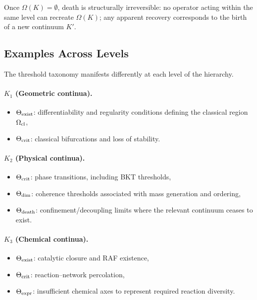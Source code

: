 Once \(\Omega(K)=\emptyset\), death is structurally irreversible:
no operator acting within the same level can recreate \(\Omega(K)\);
any apparent recovery corresponds to the birth of a new continuum \(K'\).

\subsection{Examples Across Levels}

The threshold taxonomy manifests differently at each level of the hierarchy.

\paragraph{\texorpdfstring{\(K_1\)}{K_1} (Geometric continua).}
\begin{itemize}
    \item \(\Theta_{\rm exist}\): differentiability and regularity conditions
          defining the classical region \(\Omega_{\rm cl}\),
    \item \(\Theta_{\rm crit}\): classical bifurcations and loss of stability.
\end{itemize}

\paragraph{\texorpdfstring{\(K_2\)}{K_2} (Physical continua).}
\begin{itemize}
    \item \(\Theta_{\rm crit}\): phase transitions, including BKT thresholds,
    \item \(\Theta_{\rm dim}\): coherence thresholds associated with
          mass generation and ordering,
    \item \(\Theta_{\rm death}\): confinement/decoupling limits where
          the relevant continuum ceases to exist.
\end{itemize}

\paragraph{\texorpdfstring{\(K_3\)}{K_3} (Chemical continua).}
\begin{itemize}
    \item \(\Theta_{\rm exist}\): catalytic closure and RAF existence,
    \item \(\Theta_{\rm crit}\): reaction–network percolation,
    \item \(\Theta_{\rm expr}\): insufficient chemical axes to represent
          required reaction diversity.
\end{itemize}

